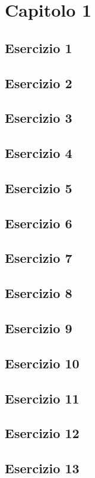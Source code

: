 \section{\textbf{Capitolo 1}}
\subsection{Esercizio 1}

\subsection{Esercizio 2}

\subsection{Esercizio 3}

\subsection{Esercizio 4}

\subsection{Esercizio 5}

\subsection{Esercizio 6}

\subsection{Esercizio 7}

\subsection{Esercizio 8}

\subsection{Esercizio 9}

\subsection{Esercizio 10}

\subsection{Esercizio 11}

\subsection{Esercizio 12}

\subsection{Esercizio 13}
